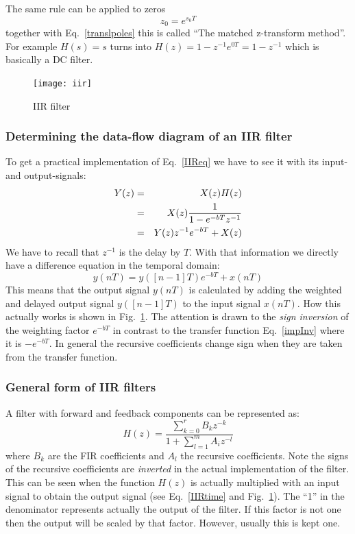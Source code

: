 \documentclass[12pt,a4paper]{article}
\begin{document}
The same rule can be applied to zeros
\begin{equation}
z_0=e^{s_0 T} \label{matchedz}
\label{transzeros}
\end{equation}
together with Eq.~\ref{translpoles} this is called ``The matched
z-transform method''. For example $H(s)=s$ turns into
$H(z)=1-z^{-1}e^{0T}=1-z^{-1}$ which is basically a DC filter.


\begin{figure}[!hbt]
\begin{center}
\mbox{\texttt{[image: iir]}}
\caption{IIR filter \label{IIRfilter}}
\end{center}
\end{figure}



\subsubsection{Determining the data-flow diagram of an IIR filter}
To get a practical implementation of Eq.~\ref{IIReq} we have
to see it with its input- and output-signals:
\begin{eqnarray}
Y(z)&=&X(z)H(z)\\
    &=&X(z) {1\over 1-e^{-bT} z^{-1}} \\
    &=&Y(z)z^{-1}e^{-bT}+X(z)
\label{Verg}
\end{eqnarray}
We have to recall that $z^{-1}$ is the delay by $T$. With that
information we directly have a difference equation in the
temporal domain:
\begin{equation}
y(nT)=y([n-1]T) e^{-bT} + x(nT)
\label{IIRtime}
\end{equation}
This means that the output signal $y(nT)$ is calculated by
adding the weighted and delayed output signal $y([n-1]T)$ 
to the input signal $x(nT)$.
How this actually works is shown in Fig.~\ref{IIRfilter}.
The attention is drawn to the \textsl{sign inversion} of the weighting
factor $e^{-bT}$ in contrast to the transfer function 
Eq.~\ref{impInv} where it is $-e^{-bT}$. In general the recursive
coefficients change sign when they are taken from the transfer
function.



\subsubsection{General form of IIR filters}
A filter with forward and feedback components can be represented as:
\begin{equation} 
H(z) = \frac{\sum_{k = 0}^{r} B_{k} z^{-k}}{1 + \sum_{l = 1}^{m} A_{i} z^{-l}} \end{equation}
where $B_k$ are the FIR coefficients and $A_l$ the recursive coefficients.
Note the signs of the recursive coefficients are \textsl{inverted} in the
actual implementation of the filter. This can be seen when the
function $H(z)$ is actually multiplied with an input signal to
obtain the output signal (see Eq.~\ref{IIRtime} and Fig.~\ref{IIRfilter}).
The ``1'' in the denominator represents actually the output of
the filter. If this factor is not one then the output will be scaled
by that factor. However, usually this is kept one.
\end{document}
